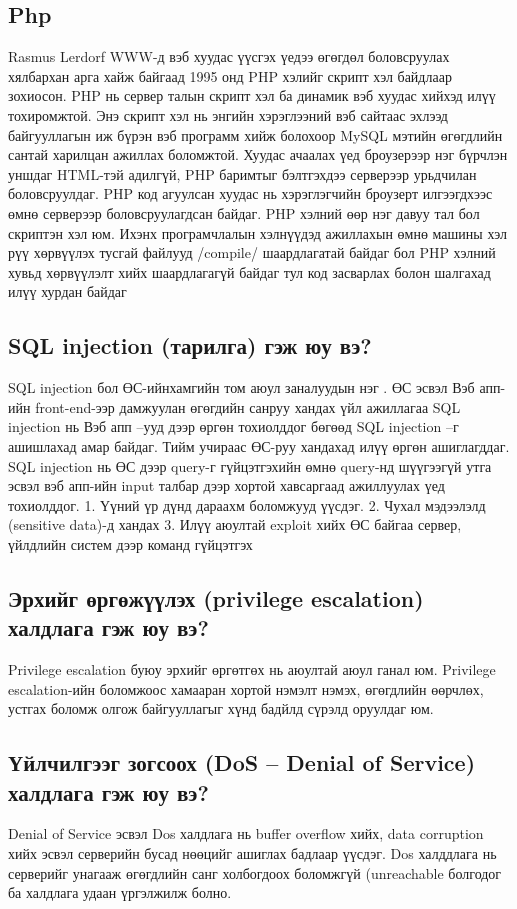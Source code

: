 \documentclass[
oneside, %
english, %
onehalfspacing, %
nolistspacing, %
headsepline, %
]{article} %
\begin{document}
	\subsection{Php}
	Rasmus Lerdorf WWW-д вэб хуудас үүсгэх үедээ өгөгдөл боловсруулах хялбархан арга хайж байгаад 1995 онд PHP хэлийг скрипт хэл байдлаар зохиосон.
	PHP нь сервер талын скрипт хэл ба динамик вэб хуудас хийхэд илүү тохиромжтой. Энэ скрипт хэл нь энгийн хэрэглээний вэб сайтаас эхлээд байгууллагын иж бүрэн вэб программ хийж болохоор MySQL мэтийн өгөгдлийн сантай харилцан ажиллах боломжтой.
	Хуудас ачаалах үед броузерээр нэг бүрчлэн уншдаг HTML-тэй адилгүй, PHP баримтыг бэлтгэхдээ серверээр урьдчилан боловсруулдаг. PHP код агуулсан хуудас нь хэрэглэгчийн броузерт илгээгдхээс өмнө серверээр боловсруулагдсан байдаг.
	PHP хэлний өөр нэг давуу тал бол скриптэн хэл юм. Ихэнх програмчлалын хэлнүүдэд ажиллахын өмнө машины хэл рүү хөрвүүлэх тусгай файлууд /compile/ шаардлагатай байдаг бол PHP хэлний хувьд хөрвүүлэлт хийх шаардлагагүй байдаг тул код засварлах болон шалгахад илүү хурдан байдаг
			\subsection{SQL injection (тарилга) гэж юу вэ? }
		SQL injection бол ӨС-ийнхамгийн том аюул заналуудын нэг .
		ӨС эсвэл Вэб апп-ийн front-end-ээр дамжуулан өгөгдийн санруу хандах үйл ажиллагаа
		SQL injection нь Вэб апп –ууд дээр өргөн тохиолддог бөгөөд SQL injection –г ашишлахад амар байдаг.
		Тийм учираас ӨС-руу хандахад илүү өргөн ашиглагддаг.
		SQL injection нь ӨС дээр query-г гүйцэтгэхийн өмнө query-нд шүүгээгүй утга эсвэл вэб апп-ийн input талбар дээр хортой хавсаргаад ажиллуулах үед тохиолддог. 
		1. Үүний үр дүнд дараахм боломжууд үүсдэг.
		2. Чухал мэдээлэлд (sensitive data)-д хандах
		3. Илүү аюултай exploit хийх
		ӨС байгаа сервер, үйлдлийн систем дээр команд гүйцэтгэх
		
		\subsection{Эрхийг өргөжүүлэх (privilege escalation) халдлага гэж юу вэ? }	
		Privilege escalation буюу эрхийг өргөтгөх нь аюултай аюул ганал юм. 
		Privilege escalation-ийн боломжоос хамааран хортой нэмэлт нэмэх, өгөгдлийн өөрчлөх, устгах боломж олгож байгууллагыг хүнд бадйлд сүрэлд оруулдаг юм.
		
		
		\subsection{Үйлчилгээг зогсоох (DoS – Denial of Service) халдлага гэж юу вэ?}
		Denial of Service эсвэл Dos халдлага нь buffer overflow хийх, data corruption хийх эсвэл серверийн бусад нөөцийг ашиглах бадлаар үүсдэг. 
		Dos халддлага нь серверийг унагааж өгөгдлийн санг холбогдоох боломжгүй (unreachable болгодог ба халдлага удаан үргэлжилж болно.
		
\end{document}
